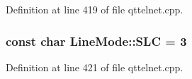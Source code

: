 Definition at line 419 of file qttelnet.cpp.

\hypertarget{namespaceLineMode_a4a0d3e56ac29300bfaca0df198a19c32}{
\subsubsection[{SLC}]{\setlength{\rightskip}{0pt plus 5cm}const char {\bf LineMode::SLC} = 3}}
\label{namespaceLineMode_a4a0d3e56ac29300bfaca0df198a19c32}


Definition at line 421 of file qttelnet.cpp.

